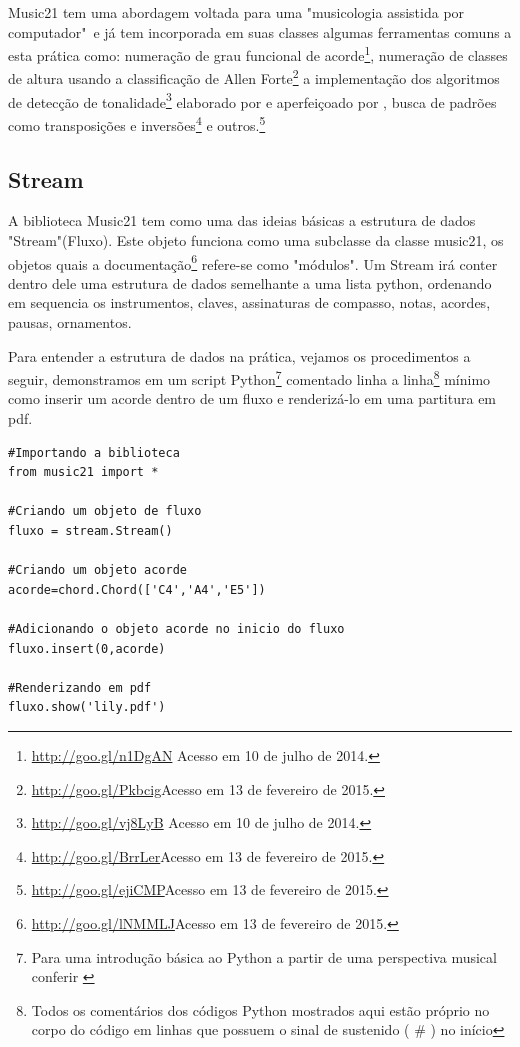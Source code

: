 \documentclass[
	12pt,				%
	openright,			%
	twoside,			%
	a4paper,			%
	english,			%
	french,				%
	spanish,			%
	brazil				%
	]{abntex2}
\begin{document}
Music21 tem uma abordagem voltada para uma "musicologia assistida por computador"\ e já tem incorporada em suas classes algumas ferramentas comuns a esta prática como: numeração de grau funcional de acorde\footnote{\url{http://goo.gl/n1DgAN} Acesso em 10 de julho de 2014.}, numeração de classes de altura usando a classificação de Allen Forte\footnote{\url{http://goo.gl/Pkbcig}Acesso em 13 de fevereiro de 2015.} a implementação dos algoritmos de detecção de tonalidade\footnote{\url{http://goo.gl/vj8LyB} Acesso em 10 de julho de 2014.} elaborado por  e aperfeiçoado por , busca de padrões como transposições e inversões\footnote{\url{http://goo.gl/BrrLer}Acesso em 13 de fevereiro de 2015.} e outros.\footnote{{\url{http://goo.gl/ejiCMP}Acesso em 13 de fevereiro de 2015.}}



\subsection{Stream}

A biblioteca Music21 tem como uma das ideias básicas a estrutura de dados "Stream"(Fluxo). Este objeto funciona como uma subclasse da classe music21, os objetos quais a documentação\footnote{\url{http://goo.gl/lNMMLJ}Acesso em 13 de fevereiro de 2015.} refere-se  como "módulos". Um Stream irá conter dentro dele uma estrutura de dados semelhante a uma lista python, ordenando em sequencia os instrumentos, claves, assinaturas de compasso, notas, acordes, pausas, ornamentos.

Para entender a estrutura de dados na prática, vejamos os procedimentos a seguir, demonstramos em um script Python\footnote{Para uma introdução básica ao Python a partir de uma perspectiva musical conferir \cite{Kroger201208} } comentado linha a linha\footnote{Todos os comentários dos códigos Python mostrados aqui estão próprio no corpo do código em linhas que possuem o sinal de sustenido ( \# ) no início} mínimo como inserir um acorde dentro de um fluxo e renderizá-lo em uma partitura em pdf.

 
\begin{lstlisting}
#Importando a biblioteca
from music21 import *

#Criando um objeto de fluxo 
fluxo = stream.Stream()

#Criando um objeto acorde
acorde=chord.Chord(['C4','A4','E5'])

#Adicionando o objeto acorde no inicio do fluxo
fluxo.insert(0,acorde)

#Renderizando em pdf
fluxo.show('lily.pdf')
\end{lstlisting}
 
\end{document}
